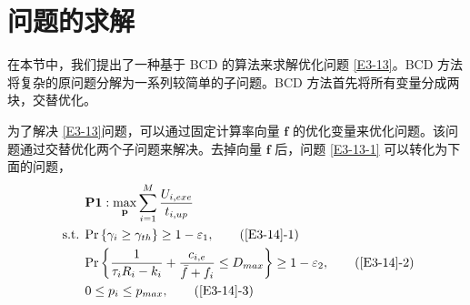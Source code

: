 \section{问题的求解}\label{section3-3}
在本节中，我们提出了一种基于 BCD 的算法来求解优化问题 \eqref{E3-13}。BCD 方法将复杂的原问题分解为一系列较简单的子问题。BCD 方法首先将所有变量分成两块，交替优化。

为了解决 \eqref{E3-13}问题，可以通过固定计算率向量 $\mathbf{f}$ 的优化变量来优化问题。该问题通过交替优化两个子问题来解决。去掉向量 $\mathbf{f}$ 后，问题 \eqref{E3-13-1} 可以转化为下面的问题，
\begin{align}
& \textbf{P1}:\max\limits_{\mathbf{p}}\sum_{i=1}^{M}\frac{U_{i,exe}}{t_{i,up}}                                  \label{E3-14}\\
\text { s.t. }
& \textrm{Pr}\left\{\gamma_i\geq\gamma_{th}\right\}\geq1-\varepsilon_1,                                         \tag{\ref{E3-14}{-1}}      \label{E3-14-1}\\  %
& \textrm{Pr}\left\{\frac{1}{\tau_iR_i-k_i}+\frac{c_{i,e}}{\bar{f}+f_i}\le D_{max}\right\}\geq1-\varepsilon_2,  \tag{\ref{E3-14}{-2}}      \label{E3-14-2}\\  %
& 0\le p_i\le p_{max},                                                                                          \tag{\ref{E3-14}{-3}}      \label{E3-14-3}  %
\end{align}

